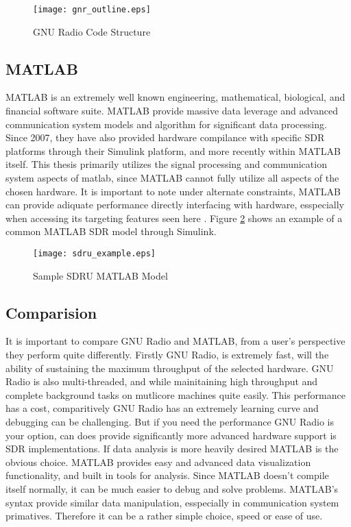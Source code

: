 \begin{figure}\label{gnr_struct}
\centering
\texttt{[image: gnr\_outline.eps]}
\caption{GNU Radio Code Structure}
\end{figure}

\subsection{MATLAB}

MATLAB is an extremely well known engineering, mathematical, biological, and financial software suite.  MATLAB provide massive data leverage and advanced communication system models and algorithm for significant data processing.  Since 2007, they have also provided hardware compilance with specific SDR platforms through their Simulink platform, and more recently within MATLAB itself\cite{matlabsdru}.  This thesis primarily utilizes the signal processing and communication system aspects of matlab, since MATLAB cannot fully utilize all aspects of the chosen hardware.  It is important to note under alternate constraints, MATLAB can provide adiquate performance directly interfacing with hardware, esspecially when accessing its targeting features seen here \cite{matlabtargeting}.  Figure \ref{sdru_example} shows an example of a common MATLAB SDR model through Simulink.\\

\begin{figure}\label{sdru_example}
\centering
\texttt{[image: sdru\_example.eps]}
\caption{Sample SDRU MATLAB Model}
\end{figure}

\subsection{Comparision}

It is important to compare GNU Radio and MATLAB, from a user's perspective they perform quite differently.  Firstly GNU Radio, is extremely fast, will the ability of sustaining the maximum throughput of the selected hardware.  GNU Radio is also multi-threaded, and while mainitaining high throughput and complete background tasks on mutlicore machines quite easily.  This performance has a cost, comparitively GNU Radio has an extremely learning curve and debugging can be challenging.  But if you need the performance GNU Radio is your option, can does provide significantly more advanced hardware support is SDR implementations.  If data analysis is more heavily desired MATLAB is the obvious choice.  MATLAB provides easy and advanced data visualization functionality, and built in tools for analysis.  Since MATLAB doesn't compile itself normally, it can be much easier to debug and solve problems.  MATLAB's syntax provide similar data manipulation, esspecially in communication system primatives.  Therefore it can be a rather simple choice, speed or ease of use.\\ 

